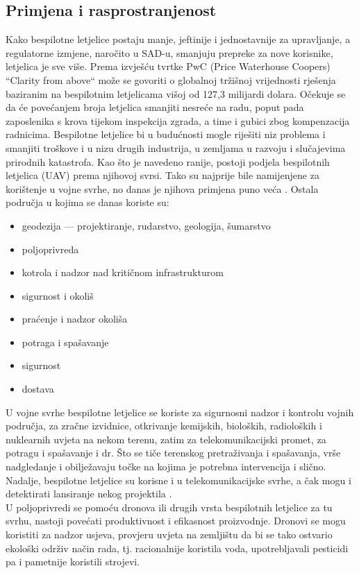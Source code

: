 \documentclass[times, utf8, diplomski]{fer}
\begin{document}
\subsection{Primjena i rasprostranjenost}
Kako bespilotne  letjelice  postaju  manje,  jeftinije  i  jednostavnije za  upravljanje,  a regulatorne izmjene, naročito u SAD-u, smanjuju prepreke za nove korisnike, letjelica je sve više. 
Prema izvješću tvrtke PwC (Price Waterhouse Coopers) “Clarity from above“ može se govoriti o globalnoj tržišnoj vrijednosti rješenja baziranim na bespilotnim letjelicama višoj od 127,3 milijardi dolara.
Očekuje se da će povećanjem broja letjelica smanjiti nesreće na radu, 
poput pada zaposlenika s krova tijekom inspekcija zgrada, a time i gubici zbog kompenzacija 
radnicima. 
Bespilotne letjelice bi u budućnosti mogle riješiti niz problema i smanjiti troškove i u nizu drugih industrija, u zemljama u razvoju i slučajevima prirodnih katastrofa. \citep{Allianz}
Kao što je navedeno ranije, postoji podjela bespilotnih letjelica (UAV) prema njihovoj svrsi. Tako  su  najprije  bile  namijenjene za korištenje u vojne svrhe, no danas je njihova primjena puno veća \citep{TheUseOfUAS}. Ostala područja u kojima se danas koriste su:\begin{itemize}
\item geodezija --- projektiranje, rudarstvo, geologija, šumarstvo
\item poljoprivreda
\item kotrola i nadzor nad kritičnom infrastrukturom
\item sigurnost i okoliš
\item praćenje i nadzor okoliša
\item potraga i spašavanje
\item sigurnost
\item dostava
\end{itemize}
U  vojne  svrhe bespilotne  letjelice  se  koriste  za  sigurnosni  nadzor  i  kontrolu  vojnih područja, za zračne izvidnice, otkrivanje kemijskih, bioloških, radioloških i nuklearnih uvjeta na nekom terenu, zatim za telekomunikacijski promet, za potragu i spašavanje i dr. Što se tiče terenskog  pretraživanja  i  spašavanja,  vrše  nadgledanje  i  obilježavaju  točke  na  kojima  je potrebna intervencija i slično. Nadalje, bespilotne letjelice  su  korisne  i  u  telekomunikacijske svrhe, a čak mogu i detektirati lansiranje nekog projektila \citep{Military}.\\
U poljoprivredi se pomoću dronova ili drugih vrsta bespilotnih letjelice za tu svrhu, nastoji povećati produktivnost i efikasnost  proizvodnje.  Dronovi  se  mogu  koristiti  za  nadzor usjeva,  provjeru  uvjeta  na  zemljištu  da  bi  se  tako  ostvario  ekološki  održiv  način  rada,  tj. racionalnije koristila voda, upotrebljavali pesticidi pa i pametnije koristili strojevi.
\end{document}
